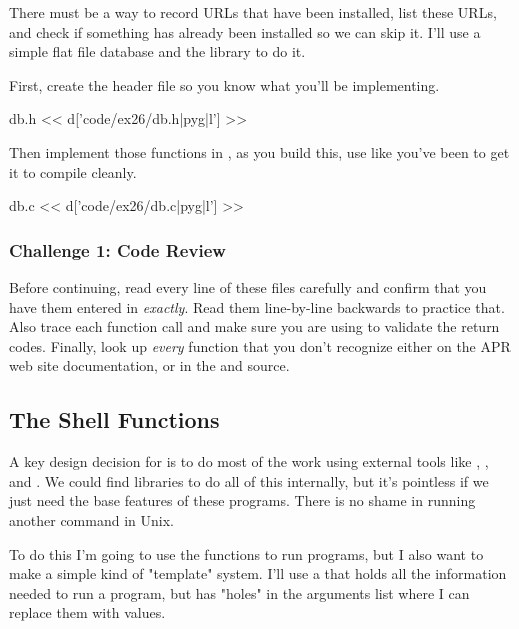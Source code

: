 There must be a way to record URLs that have been installed, list these
URLs, and check if something has already been installed so we can
skip it.  I'll use a simple flat file database and the 
library to do it.

First, create the  header file so you know what you'll be
implementing.

\begin{code}{db.h}
<< d['code/ex26/db.h|pyg|l'] >>
\end{code}

Then implement those functions in , as you build this, use
 like you've been to get it to compile cleanly.

\begin{code}{db.c}
<< d['code/ex26/db.c|pyg|l'] >>
\end{code}

\subsubsection{Challenge 1: Code Review}

Before continuing, read every line of these files carefully and 
confirm that you have them entered in \emph{exactly}.  Read them
line-by-line backwards to practice that. Also trace each function 
call and make sure you are using  to validate the
return codes.  Finally, look up \emph{every} function that you
don't recognize either on the APR web site documentation, or
in the  and  source.


\subsection{The Shell Functions}

A key design decision for  is to do most of the work
using external tools like , , and .
We could find libraries to do all of this internally, but it's pointless
if we just need the base features of these programs.  There is no shame
in running another command in Unix.

To do this I'm going to use the  functions
to run programs, but I also want to make a simple kind of "template"
system.  I'll use a  that holds all the information
needed to run a program, but has "holes" in the arguments list where I
can replace them with values.

